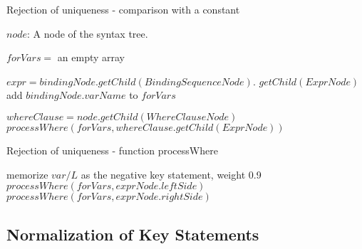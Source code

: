 \begin{algorithm}
\caption{Rejection of uniqueness - comparison with a constant}
\label{ALG_rejection_of_uniqueness_comparison_with_a_constant}
\begin{algorithmic}[1]
\REQUIRE $node$: A node of the syntax tree.

	\STATE $forVars =$ an empty array

            \STATE $expr = bindingNode.getChild(BindingSequenceNode).$ $getChild(ExprNode)$
                \STATE add $bindingNode.varName$ to $forVars$
            \ENDIF
        \ENDIF
    \ENDFOR
    
    \STATE $whereClause = node.getChild(WhereClauseNode)$
    	\STATE $processWhere(forVars, whereClause.getChild(ExprNode))$
	\ENDIF
\ENDIF
\end{algorithmic}
\end{algorithm}

\begin{algorithm}
\caption{Rejection of uniqueness - function processWhere}
\label{ALG_rejection_of_uniqueness_function_process_where}
\begin{algorithmic}[1]

                \STATE memorize $var/L$ as the negative key statement, weight 0.9
            \ENDIF
        \ENDFOR
        \STATE $processWhere(forVars, exprNode.leftSide)$
        \STATE $processWhere(forVars, exprNode.rightSide)$
    \ENDIF
\ENDIF
\end{algorithmic}
\end{algorithm}

\subsection{Normalization of Key Statements}
